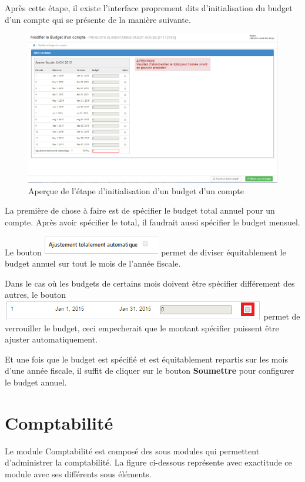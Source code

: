\documentclass[12pt,a4paper]{report}
\begin{document}
\newpage
Après cette étape, il existe l'interface proprement dits d'initialisation du budget d'un compte qui se présente de la manière suivante.

\begin{figure}[h]
\begin{center}
\includegraphics[width=12cm]{pic/ModifierBudgetCompt2.png}
\end{center}
\caption{Aperçue de l'étape d'initialisation d'un budget d'un compte}
\label{Aperçue de l'étape d'initialisation d'un budget d'un compte}
\end{figure}

La première de chose à faire est de spécifier le budget total annuel pour un compte.
Après avoir spécifier le total, il faudrait aussi spécifier le budget mensuel.

Le bouton \includegraphics[scale=0.7]{pic/AjustBudget.png} permet de diviser équitablement le budget annuel sur tout le mois de l'année fiscale.

Dans le cas où les budgets de certains mois doivent être spécifier différement des autres, le bouton \includegraphics[scale=0.7]{pic/BudgetGeler.png} permet de verrouiller le budget, ceci empecherait que le montant spécifier puissent être ajuster automatiquement.

Et une fois que le budget est spécifié et est équitablement repartis sur les mois d'une année fiscale, il suffit de cliquer sur le bouton \textbf{Soumettre} pour configurer le budget annuel.


\newpage
\chapter{Comptabilité}        
Le module Comptabilité est composé des sous modules qui permettent d'administrer la comptabilité. La figure ci-dessous représente avec exactitude ce module avec ses différents sous éléments.
\end{document}
